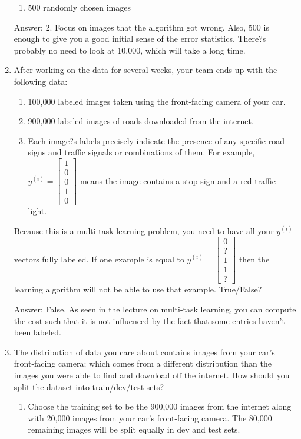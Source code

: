 \documentclass[12pt]{article}
\numberwithin{equation}{section}
\begin{document}
\begin{enumerate}
\begin{enumerate}
		\item 500 randomly chosen images
	\end{enumerate} \par
	Answer: 2. Focus on images that the algorithm got wrong. Also, 500 is enough to give you a good initial sense of the error statistics. There?s probably no need to look at 10,000, which will take a long time.
	\item After working on the data for several weeks, your team ends up with the following data:
	\begin{enumerate}
		\item 100,000 labeled images taken using the front-facing camera of your car.
		\item 900,000 labeled images of roads downloaded from the internet.
		\item Each image?s labels precisely indicate the presence of any specific road signs and traffic signals or combinations of them. For example, $y^{(i)} =\begin{bmatrix} 1\\0\\0\\1\\0\end{bmatrix}$ means the image contains a stop sign and a red traffic light.
	\end{enumerate} \par
Because this is a multi-task learning problem, you need to have all your $y^{(i)}$ vectors fully labeled. If one example is equal to  $y^{(i)} =\begin{bmatrix} 0\\?\\1\\1\\?\end{bmatrix}$ then the learning algorithm will not be able to use that example. True/False? \par
	Answer: False. As seen in the lecture on multi-task learning, you can compute the cost such that it is not influenced by the fact that some entries haven't been labeled.
	\item The distribution of data you care about contains images from your car's front-facing camera; which comes from a different distribution than the images you were able to find and download off the internet. How should you split the dataset into train/dev/test sets? \par
	\begin{enumerate}
		\item Choose the training set to be the 900,000 images from the internet along with 20,000 images from your car's front-facing camera. The 80,000 remaining images will be split equally in dev and test sets.

\end{enumerate}
\end{enumerate}
\end{document}
